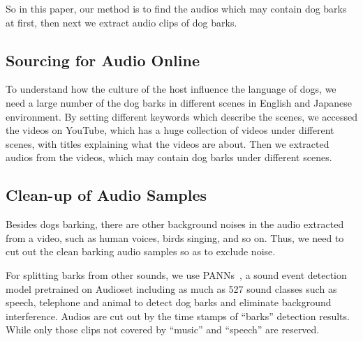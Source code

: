 So in this paper, our method is to find the audios which may contain dog barks at first, then next we extract audio clips of dog barks.

\subsection{Sourcing for Audio Online}
To understand how the culture of the host influence the language of dogs, we need a large number of the dog barks in different scenes in English and Japanese environment. By setting different keywords which describe the scenes, we accessed the videos on YouTube, which has a huge collection of videos under different scenes, with titles explaining what the videos are about. Then we extracted audios from the videos, which may contain dog barks under different scenes.

\subsection{Clean-up of Audio Samples}
Besides dogs barking, there are other background noises in the audio extracted from a video, such as human voices, birds singing, and so on. Thus, we need to cut out the clean barking audio samples so as to exclude noise. 

For splitting barks from other sounds, we use PANNs~\cite{kong2020panns}, a sound event detection model pretrained on Audioset including as much as 527 sound classes such as speech, telephone and animal to detect dog barks and eliminate background interference. Audios are cut out by the time stamps of ``barks'' detection results. While only those clips not covered by ``music'' and ``speech'' are reserved.

